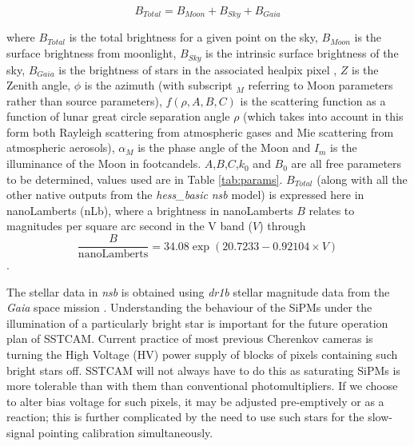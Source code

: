 \begin{equation}
    B_{Total}=B_{Moon}+B_{Sky}+B_{Gaia}
\end{equation}

where $B_{Total}$ is the total brightness for a given point on the sky, $B_{Moon}$ is the surface brightness from moonlight, $B_{Sky}$ is the intrinsic surface brightness of the sky, $B_{Gaia}$ is the brightness of stars in the associated healpix pixel \cite{healpix}, $Z$ is the Zenith angle, $\phi$ is the azimuth (with subscript $_M$ referring to Moon parameters rather than source parameters), $f(\rho,A,B,C)$ is the scattering function as a function of lunar great circle separation angle $\rho$ (which takes into account in this form both Rayleigh scattering from atmospheric gases and Mie scattering from atmospheric aerosols), $\alpha_M$ is the phase angle of the Moon and $I_m$ is the illuminance of the Moon in footcandels. $A$,$B$,$C$,$k_0$ and $B_0$ are all free parameters to be determined, values used are in Table \ref{tab:params}. $B_{Total}$ (along with all the other native outputs from the \textit{hess\_basic} \textit{nsb} model) is expressed here in nanoLamberts (nLb), where a brightness in nanoLamberts $B$ relates to magnitudes per square arc second in the V band ($V$) through
\begin{equation}
    \frac{B}{\textrm{nanoLamberts}}=34.08\exp(20.7233-0.92104\times V)
\end{equation}
\cite{Krisciunas}.

The stellar data in \textit{nsb} is obtained using \textit{dr1b} stellar magnitude data from the \textit{Gaia} space mission \cite{gaiadr1a}\cite{gaiadr1b}. Understanding the behaviour of the SiPMs under the illumination of a particularly bright star is important for the future operation plan of SSTCAM. Current practice of most previous Cherenkov cameras is turning the High Voltage (HV) power supply of blocks of pixels containing such bright stars off. SSTCAM will not always have to do this as saturating SiPMs is more tolerable than with them than conventional photomultipliers. If we choose to alter bias voltage for such pixels, it may be adjusted pre-emptively or as a reaction; this is further complicated by the need to use such stars for the slow-signal pointing calibration simultaneously. 

